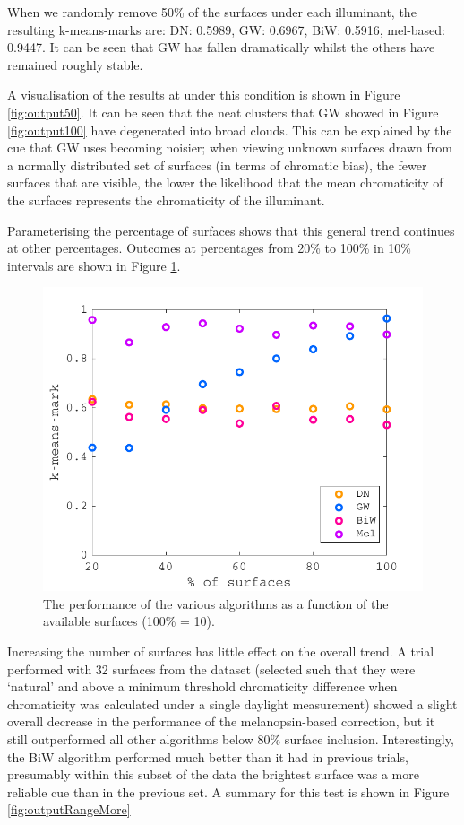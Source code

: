 When we randomly remove 50\% of the surfaces under each illuminant, the resulting k-means-marks are: \gls{DN}: 0.5989, \gls{GW}: 0.6967, \gls{BiW}: 0.5916, mel-based: 0.9447. It can be seen that \gls{GW} has fallen dramatically whilst the others have remained roughly stable. 

A visualisation of the results at under this condition is shown in Figure \ref{fig:output50}. It can be seen that the neat clusters that \gls{GW} showed in Figure \ref{fig:output100} have degenerated into broad clouds. This can be explained by the cue that \gls{GW} uses becoming noisier; when viewing unknown surfaces drawn from a normally distributed set of surfaces (in terms of chromatic bias), the fewer surfaces that are visible, the lower the likelihood that the mean chromaticity of the surfaces represents the chromaticity of the illuminant. 

Parameterising the percentage of surfaces shows that this general trend continues at other percentages. Outcomes at percentages from 20\% to 100\% in 10\% intervals are shown in Figure \ref{fig:outputRange}.

\begin{figure}[htbp]
 \includegraphics[max width=\textwidth]{figs/comp/comparisonFourAlgos/outputRange.pdf}
 \caption{The performance of the various algorithms as a function of the available surfaces (100\% = 10).}
 \label{fig:outputRange}
\end{figure} 

Increasing the number of surfaces has little effect on the overall trend. A trial performed with 32 surfaces from the \citet{vrhel_measurement_1994} dataset (selected such that they were `natural' and above a minimum threshold chromaticity difference when chromaticity was calculated under a single daylight measurement) showed a slight overall decrease in the performance of the melanopsin-based correction, but it still outperformed all other algorithms below 80\% surface inclusion. Interestingly, the \gls{BiW} algorithm performed much better than it had in previous trials, presumably within this subset of the data the brightest surface was a more reliable cue than in the previous set. A summary for this test is shown in Figure \ref{fig:outputRangeMore}

